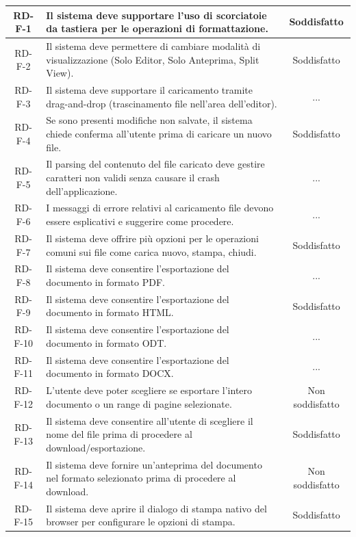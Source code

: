 \documentclass[11pt,a4paper]{article}
\begin{document}
\begin{longtable}{|c|p{11cm}|c|}
RD-F-1 & Il sistema deve supportare l'uso di scorciatoie da tastiera per le operazioni di formattazione. & Soddisfatto \\
\hline
RD-F-2 & Il sistema deve permettere di cambiare modalità di visualizzazione (Solo Editor, Solo Anteprima, Split View). & Soddisfatto \\
\hline
RD-F-3 & Il sistema deve supportare il caricamento tramite drag-and-drop (trascinamento file nell'area dell'editor). & ... \\
\hline
RD-F-4 & Se sono presenti modifiche non salvate, il sistema chiede conferma all'utente prima di caricare un nuovo file. & Soddisfatto\\
\hline
RD-F-5 & Il parsing del contenuto del file caricato deve gestire caratteri non validi senza causare il crash dell'applicazione. & ... \\
\hline
RD-F-6 & I messaggi di errore relativi al caricamento file devono essere esplicativi e suggerire come procedere. & ... \\
\hline
RD-F-7 & Il sistema deve offrire più opzioni per le operazioni comuni sui file come carica nuovo, stampa, chiudi. & Soddisfatto \\
\hline
RD-F-8 & Il sistema deve consentire l'esportazione del documento in formato PDF. & ... \\
\hline
RD-F-9 & Il sistema deve consentire l'esportazione del documento in formato HTML. & Soddisfatto \\
\hline
RD-F-10 & Il sistema deve consentire l'esportazione del documento in formato ODT. & ... \\
\hline
RD-F-11 & Il sistema deve consentire l'esportazione del documento in formato DOCX. & ... \\
\hline
RD-F-12 & L'utente deve poter scegliere se esportare l'intero documento o un range di pagine selezionate. & Non soddisfatto \\
\hline
RD-F-13 & Il sistema deve consentire all'utente di scegliere il nome del file prima di procedere al download/esportazione. & Soddisfatto \\
\hline
RD-F-14 & Il sistema deve fornire un'anteprima del documento nel formato selezionato prima di procedere al download. & Non soddisfatto \\
\hline
RD-F-15 & Il sistema deve aprire il dialogo di stampa nativo del browser per configurare le opzioni di stampa. & Soddisfatto \\
\hline


\end{longtable}
\end{document}
